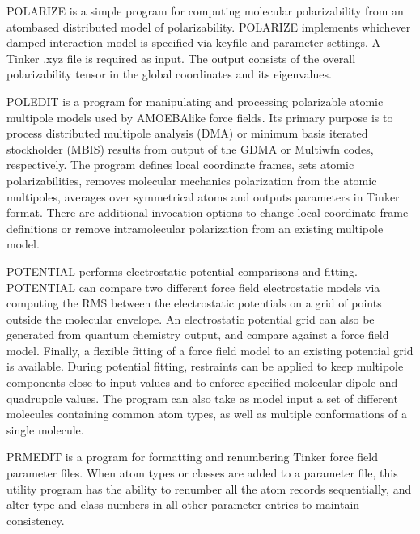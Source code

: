 \documentclass[letterpaper,11pt,english]{sphinxmanual}
\begin{document}
\sphinxAtStartPar
{}

\sphinxAtStartPar
POLARIZE is a simple program for computing molecular polarizability from an atom\sphinxhyphen{}based distributed model of polarizability. POLARIZE implements whichever damped interaction model is specified via keyfile and parameter settings. A Tinker .xyz file is required as input. The output consists of the overall polarizability tensor in the global coordinates and its eigenvalues.

\sphinxAtStartPar
{}

\sphinxAtStartPar
POLEDIT is a program for manipulating and processing polarizable atomic multipole models used by AMOEBA\sphinxhyphen{}like force fields. Its primary purpose is to process distributed multipole analysis (DMA) or minimum basis iterated stockholder (MBIS) results from output of the GDMA or Multiwfn codes, respectively. The program defines local coordinate frames, sets atomic polarizabilities, removes molecular mechanics polarization from the atomic multipoles, averages over symmetrical atoms and outputs parameters in Tinker format. There are additional invocation options to change local coordinate frame definitions or remove intramolecular polarization from an existing multipole model.

\sphinxAtStartPar
{}

\sphinxAtStartPar
POTENTIAL performs electrostatic potential comparisons and fitting. POTENTIAL can compare two different force field electrostatic models via computing the RMS between the electrostatic potentials on a grid of points outside the molecular envelope. An electrostatic potential grid can also be generated from quantum chemistry output, and compare against a force field model. Finally, a flexible fitting of a force field model to an existing potential grid is available. During potential fitting, restraints can be applied to keep multipole components close to input values and to enforce specified molecular dipole and quadrupole values. The program can also take as model input a set of different molecules containing common atom types, as well as multiple conformations of a single molecule.

\sphinxAtStartPar
{}

\sphinxAtStartPar
PRMEDIT is a program for formatting and renumbering Tinker force field parameter files. When atom types or classes are added to a parameter file, this utility program has the ability to renumber all the atom records sequentially, and alter type and class numbers in all other parameter entries to maintain consistency.
\end{document}
